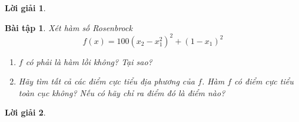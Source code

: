 \documentclass[14pt, a4paper]{article}
\theoremstyle{sltheorem}
\newtheorem{baitap}{Bài tập}
\newtheorem*{loigiai}{Lời giải}
\begin{document}
    \begin{loigiai}
    \end{loigiai}

    \begin{baitap}
        Xét hàm số Rosenbrock
        \begin{equation*}
            f(x)=100(x_2 - x_1^2)^2 + (1-x_1)^2
        \end{equation*}
        \begin{enumerate}[wide, labelwidth=!, labelindent=0pt,label=\textbf{\arabic*}.]
            \item $f$ có phải là hàm lồi không? Tại sao?
            \item Hãy tìm tất cả các điểm cực tiểu địa phương của $f$. Hàm $f$ có điểm cực tiểu toàn cục không? Nếu có hãy chỉ ra điểm đó là điểm nào?
        \end{enumerate}
    \end{baitap}

    \begin{loigiai}

    \end{loigiai}

    \newpage
    \printbibliography[title={TÀI LIỆU THAM KHẢO}]
\end{document}
